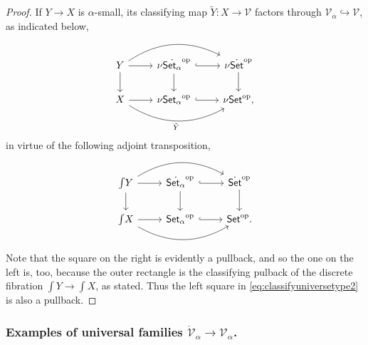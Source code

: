 \documentclass[11pt,reqno]{amsart}
\newcommand{\Set}{\ensuremath{\mathsf{Set}}}
\newcommand{\op}[1]{\ensuremath{{#1}^{\mathrm{op}}}}
\newcommand{\hook}{\ensuremath{\hookrightarrow}}
\renewcommand{\to}{\ensuremath{\rightarrow}}
\newcommand{\too}{\ensuremath{\longrightarrow}}
\newcommand{\elem}[1]{\textstyle\int\!{#1}}%
\newcommand{\V}{\ensuremath{\mathcal{V}}}
\newcommand{\VV}{\ensuremath{\dot{\mathcal{V}}}}
\theoremstyle{remark}
\theoremstyle{definition}
\begin{document}
\begin{proof} If $Y\to X$ is $\alpha$-small, its classifying map $\tilde{Y} : X\to\V$ factors through $\V_\alpha \hook \V$, as indicated below, 
\begin{equation}\label{eq:classifyuniversetype2}\textstyle
\begin{tikzcd}
	 Y \ar[d] \ar[rr, bend left] \ar[r] & \nu\op{\dot{\Set_\alpha}} \ar[d] \ar[r,hook] & \nu\op{\dot{\Set}} \ar[d]\\  
	X \ar[rr, bend right, swap,"\tilde{Y}"] \ar[r] &  \nu\op{\Set_\alpha} \ar[r,hook] &  \nu\op{\Set},
 \end{tikzcd}
 \end{equation}
%
in virtue of the following adjoint transposition,
\begin{equation}\label{eq:adjointtranspose}\textstyle
\begin{tikzcd}
	 \elem Y \ar[d] \ar[rr, bend left] \ar[r] & \op{\dot{\Set_\alpha}} \ar[d] \ar[r,hook] & \op{\dot{\Set}} \ar[d]\\  
	 \elem X \ar[rr, bend right, ] \ar[r]  &  \op{\Set_\alpha} \ar[r,hook]  &  \op{\Set}.
 \end{tikzcd}
  \end{equation}
Note that the square on the right is evidently a pullback, and so the one on the left is, too, because the outer rectangle is the classifying pulback of the discrete fibration $\elem Y \to \elem X$, as stated.  Thus the left square in \eqref{eq:classifyuniversetype2} is also a pullback.
\end{proof}

\subsubsection*{Examples of universal families $\VV_\alpha \too \V_\alpha$.}\label{examples:universalfamilies}
\end{document}

